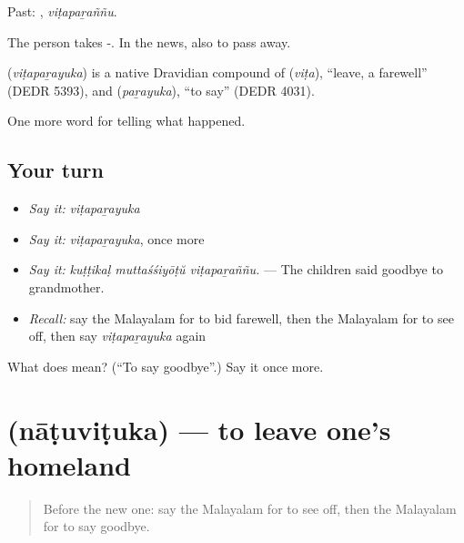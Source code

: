 Past: , \emph{viṭapaṟaññu}.

The person takes -. In the news, also to pass away.

\begin{cousinweb}
\textbf{} (\emph{viṭapaṟayuka}) is a native Dravidian compound of  (\emph{viṭa}), \textquotedblleft{}leave, a farewell\textquotedblright{} (DEDR 5393), and  (\emph{paṟayuka}), \textquotedblleft{}to say\textquotedblright{} (DEDR 4031).
\end{cousinweb}

\begin{grammarlens}[title={What you've built}]
One more word for telling what happened.
\end{grammarlens}

\subsection*{Your turn}
\begin{itemize}
\raggedright
  \item \emph{Say it:} \emph{viṭapaṟayuka}
  \item \emph{Say it:} \emph{viṭapaṟayuka}, once more
  \item \emph{Say it:} \emph{kuṭṭikaḷ muttaśśiyōṭŭ viṭapaṟaññu.} — The children said goodbye to grandmother.
  \item \emph{Recall:} say the Malayalam for to bid farewell, then the Malayalam for to see off, then say \emph{viṭapaṟayuka} again
\end{itemize}

\begin{tcolorbox}[breakable,colback=teal!4,colframe=teal!35!black,title={Before you move on}]
What does  mean? (\textquotedblleft{}To say goodbye\textquotedblright{}.) Say it once more.
\end{tcolorbox}
\section[\texorpdfstring{\ml{നാടുവിടുക} (nāṭuviṭuka)}{നാടുവിടുക (nāṭuviṭuka)}]{ (nāṭuviṭuka) — to leave one's homeland}

\label{lesson:ML-C390-natuvituka}



\begin{quote}
Before the new one: say the Malayalam for to see off, then the Malayalam for to say goodbye.
\end{quote}

